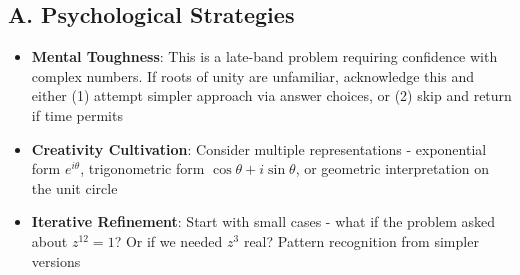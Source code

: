 \documentclass[]{article}
\begin{document}
\begin{strategicbox}
\subsection*{A. Psychological Strategies}
\begin{itemize}[leftmargin=*]
    \item \textbf{Mental Toughness}: This is a late-band problem requiring confidence with complex numbers. If roots of unity are unfamiliar, acknowledge this and either (1) attempt simpler approach via answer choices, or (2) skip and return if time permits
    \item \textbf{Creativity Cultivation}: Consider multiple representations - exponential form $e^{i\theta}$, trigonometric form $\cos\theta + i\sin\theta$, or geometric interpretation on the unit circle
    \item \textbf{Iterative Refinement}: Start with small cases - what if the problem asked about $z^{12} = 1$? Or if we needed $z^3$ real? Pattern recognition from simpler versions
\end{itemize}


\end{strategicbox}
\end{document}

